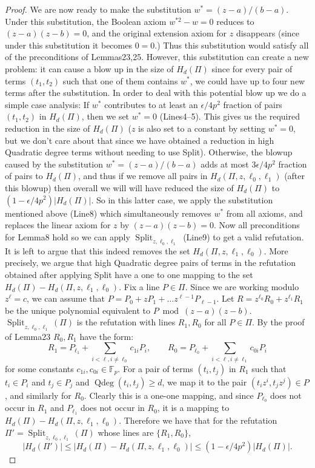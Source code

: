 \documentclass[10pt,a4paper]{article}
\DeclareMathOperator{\Qdeg}{Qdeg}
\DeclareMathOperator{\Split}{Split}
\begin{document}
\begin{proof}
We are now ready to make the substitution $w^*=(z-a)/(b-a)$. Under this substitution, the Boolean axiom $w^{*2}-w=0$ reduces to $(z-a)(z-b)=0$, and the original extension axiom for $z$ disappears (since under this substitution it becomes $0=0$.) Thus this substitution would satisfy all of the preconditions of Lemmas23,25. However, this substitution can create a new problem: it can cause a blow up in the size of $H_d(\Pi)$ since for every pair of terms $(t_1,t_2)$ such that one of them contains $w^*$, we could have up to four new terms after the substitution. In order to deal with this potential blow up we do a simple case analysis: If $w^*$ contributes to at least an $\epsilon/4p^2$ fraction of pairs $(t_1,t_2)$ in $H_d(\Pi)$, then we set $w^*=0$ (Lines4–5). This gives us the required reduction in the size of $H_d(\Pi)$ ($z$ is also set to a constant by setting $w^*=0$, but we don't care about that since we have obtained a reduction in high Quadratic degree terms without needing to use Split). Otherwise, the blowup caused by the substitution $w^*=(z-a)/(b-a)$ adds at most $3\epsilon/4p^2$ fraction of pairs to $H_d(\Pi)$, and thus if we remove all pairs in $H_d(\Pi,z,\ell_0,\ell_1)$ (after this blowup) then overall we will will have reduced the size of $H_d(\Pi)$ to $(1-\epsilon/4p^2)|H_d(\Pi)|$. So in this latter case, we apply the substitution mentioned above (Line8) which simultaneously removes $w^*$ from all axioms, and replaces the linear axiom for $z$ by $(z-a)(z-b)=0$. Now all preconditions for Lemma8 hold so we can apply $\Split_{z,\ell_0,\ell_1}$ (Line9) to get a valid refutation. It is left to argue that this indeed removes the set $H_d(\Pi,z,\ell_1,\ell_0)$. More precisely, we argue that high Quadratic degree pairs of terms in the refutation obtained after applying Split have a one to one mapping to the set $H_d(\Pi)-H_d(\Pi,z,\ell_1,\ell_0)$. Fix a line $P\in\Pi$. Since we are working modulo $z^{\ell}=c$, we can assume that $P=P_0+zP_1+\ldots z^{\ell-1}P_{\ell-1}$. Let $R=z^{\ell_0}R_0+z^{\ell_1}R_1$ be the unique polynomial equivalent to $P\bmod(z-a)(z-b)$. $\Split_{z,\ell_0,\ell_1}(\Pi)$ is the refutation with lines $R_1,R_0$ for all $P\in\Pi$. By the proof of Lemma23 $R_0,R_1$ have the form:
\[R_1=P_{\ell_1}+\sum_{i<\ell,i\neq\ell_0}c_{1i}P_i,\qquad R_0=P_{\ell_0}+\sum_{i<\ell,i\neq\ell_1}c_{0i}P_i\]
for some constants $c_{1i},c_{0i}\in\mathbb F_p$.
For a pair of terms $(t_i,t_j)$ in $R_1$ such that $t_i\in P_i$ and $t_j\in P_j$ and $\Qdeg(t_i,t_j)\geq d$, we map it to the pair $(t_iz^i,t_jz^j)\in P$, and similarly for $R_0$. Clearly this is a one-one mapping, and since $P_{\ell_0}$ does not occur in $R_1$ and $P_{\ell_1}$ does not occur in $R_0$, it is a mapping to $H_d(\Pi)-H_d(\Pi,z,\ell_1,\ell_0)$. Therefore we have that for the refutation $\Pi'=\Split_{z,\ell_0,\ell_1}(\Pi)$ whose lines are $\{R_1,R_0\}$,
\[|H_d(\Pi')|\leq|H_d(\Pi)-H_d(\Pi,z,\ell_1,\ell_0)|\leq(1-\epsilon/4p^2)|H_d(\Pi)|.\]
\end{proof}
\end{document}
